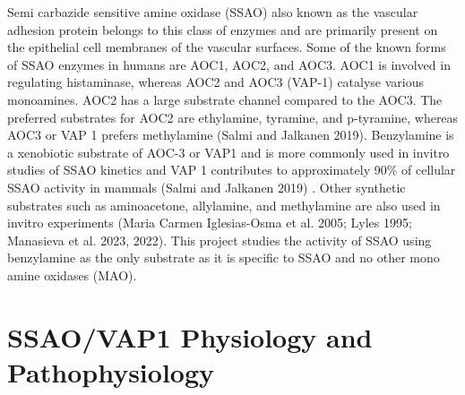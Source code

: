 \documentclass[
  letterpaper,
  DIV=11,
  numbers=noendperiod]{scrreprt}
\begin{document}
Semi carbazide sensitive amine oxidase (SSAO) also known as the vascular
adhesion protein belongs to this class of enzymes and are primarily
present on the epithelial cell membranes of the vascular surfaces. Some
of the known forms of SSAO enzymes in humans are AOC1, AOC2, and AOC3.
AOC1 is involved in regulating histaminase, whereas AOC2 and AOC3
(VAP-1) catalyse various monoamines. AOC2 has a large substrate channel
compared to the AOC3. The preferred substrates for AOC2 are ethylamine,
tyramine, and p-tyramine, whereas AOC3 or VAP 1 prefers methylamine
(Salmi and Jalkanen 2019). Benzylamine is a xenobiotic substrate of
AOC-3 or VAP1 and is more commonly used in invitro studies of SSAO
kinetics and VAP 1 contributes to approximately 90\% of cellular SSAO
activity in mammals (Salmi and Jalkanen 2019) . Other synthetic
substrates such as aminoacetone, allylamine, and methylamine are also
used in invitro experiments (Maria Carmen Iglesias-Osma et al. 2005;
Lyles 1995; Manasieva et al. 2023, 2022). This project studies the
activity of SSAO using benzylamine as the only substrate as it is
specific to SSAO and no other mono amine oxidases (MAO).

\section{\texorpdfstring{\textbf{SSAO/VAP1 Physiology and
Pathophysiology}}{SSAO/VAP1 Physiology and Pathophysiology}}\label{ssaovap1-physiology-and-pathophysiology}
\end{document}
